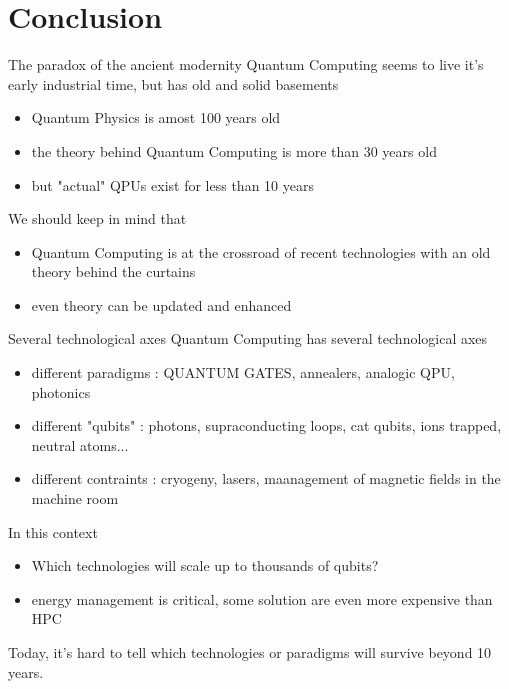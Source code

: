\section{Conclusion}

\begin{frame}{The paradox of the ancient modernity}
Quantum Computing seems to live it's early industrial time, but has old and solid basements
\begin{itemize}
    \item Quantum Physics is amost 100 years old
    \item the theory behind Quantum Computing is more than 30 years old
    \item but "actual" QPUs exist for less than 10 years
\end{itemize}
We should keep in mind that 
\begin{itemize}
    \item Quantum Computing is at the crossroad of recent technologies with an old theory behind the curtains
    \item even theory can be updated and enhanced
\end{itemize}
\end{frame}

\begin{frame}{Several technological axes}
Quantum Computing has several technological axes
\begin{itemize}
    \item different paradigms : QUANTUM GATES, annealers, analogic QPU, photonics
    \item different "qubits" : photons, supraconducting loops, cat qubits, ions trapped, neutral atoms...
    \item different contraints : cryogeny, lasers, maanagement of magnetic fields in the machine room
\end{itemize}
In this context
\begin{itemize}
    \item Which technologies will scale up to thousands of qubits?
    \item energy management is critical, some solution are even more expensive than HPC
\end{itemize}
Today, it's hard to tell which technologies or paradigms will survive beyond 10 years.
\end{frame}

